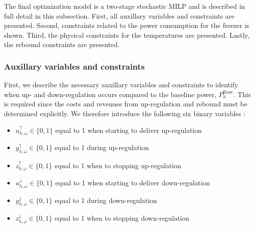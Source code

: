 

The final optimization model is a two-stage stochastic MILP and is described in full detail in this subsection. First, all auxillary variables and constraints are presented. Second, constraints related to the power consumption for the freezer is shown. Third, the physical constraints for the temperatures are presented. Lastly, the rebound constraints are presented.


\subsubsection{Auxillary variables and constraints}\label{sec:aux_constraints}

First, we describe the necessary auxillary variables and constraints to identify when up- and down-regulation occurs compared to the baseline power, $P^{\text{Base}}_{h}$. This is required since the costs and revenues from up-regulation and rebound must be determined explicitly. We therefore introduce the following six binary variables \cite{morales2013integrating}:
\\
\begin{itemize}
    \item $u^{\uparrow}_{h,\omega} \in \{0,1\}$ equal to 1 when starting to deliver up-regulation
    \item $y^{\uparrow}_{h,\omega} \in \{0,1\}$ equal to 1 during up-regulation
    \item $z^{\uparrow}_{h,\omega} \in \{0,1\}$ equal to 1 when to stopping up-regulation
    \item $u^{\downarrow}_{h,\omega} \in \{0,1\}$ equal to 1 when starting to deliver down-regulation
    \item $y^{\downarrow}_{h,\omega} \in \{0,1\}$ equal to 1 during down-regulation
    \item $z^{\downarrow}_{h,\omega} \in \{0,1\}$ equal to 1 when to stopping down-regulation
\end{itemize}

